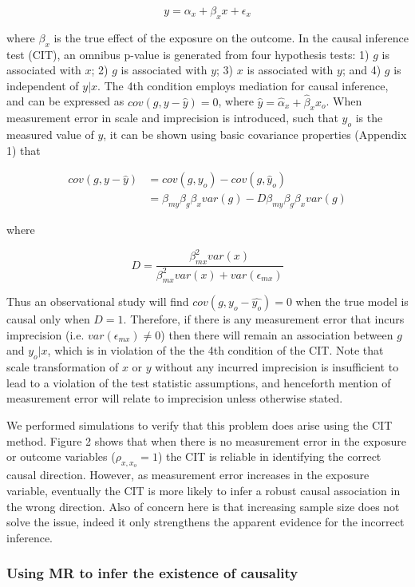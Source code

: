 \documentclass[]{article}
\begin{document}
\[
y = \alpha_x + \beta_x x + \epsilon_x
\]

where \(\beta_x\) is the true effect of the exposure on the outcome. In
the causal inference test (CIT), an omnibus p-value is generated from
four hypothesis tests: 1) \(g\) is associated with \(x\); 2) \(g\) is
associated with \(y\); 3) \(x\) is associated with \(y\); and 4) \(g\)
is independent of \(y|x\). The 4th condition employs mediation for
causal inference, and can be expressed as \(cov(g, y - \hat{y}) = 0\),
where \(\hat{y} = \hat{\alpha}_x + \hat{\beta}_x x_o\). When measurement
error in scale and imprecision is introduced, such that \(y_o\) is the
measured value of \(y\), it can be shown using basic covariance
properties (Appendix 1) that

\[
\begin{aligned}
cov(g, y - \hat{y}) & = cov(g, y_o) - cov(g, \hat{y}_o)  \\
                    & = \beta_{my} \beta_g \beta_x var(g) - D \beta_{my} \beta_g \beta_x var(g)
\end{aligned}
\]

where

\[
D = \frac{\beta^2_{mx} var(x)} {\beta^2_{mx} var(x) + var(\epsilon_{mx})}
\]

Thus an observational study will find \(cov(g, y_o - \hat{y_o}) = 0\)
when the true model is causal only when \(D = 1\). Therefore, if there
is any measurement error that incurs imprecision (i.e.
\(var(\epsilon_{mx}) \neq 0\)) then there will remain an association
between \(g\) and \(y_o | x\), which is in violation of the the 4th
condition of the CIT. Note that scale transformation of \(x\) or \(y\)
without any incurred imprecision is insufficient to lead to a violation
of the test statistic assumptions, and henceforth mention of measurement
error will relate to imprecision unless otherwise stated.

We performed simulations to verify that this problem does arise using
the CIT method. Figure 2 shows that when there is no measurement error
in the exposure or outcome variables (\(\rho_{x, x_o}=1\)) the CIT is
reliable in identifying the correct causal direction. However, as
measurement error increases in the exposure variable, eventually the CIT
is more likely to infer a robust causal association in the wrong
direction. Also of concern here is that increasing sample size does not
solve the issue, indeed it only strengthens the apparent evidence for
the incorrect inference.

\subsubsection{Using MR to infer the existence of
causality}\label{using-mr-to-infer-the-existence-of-causality}
\end{document}
